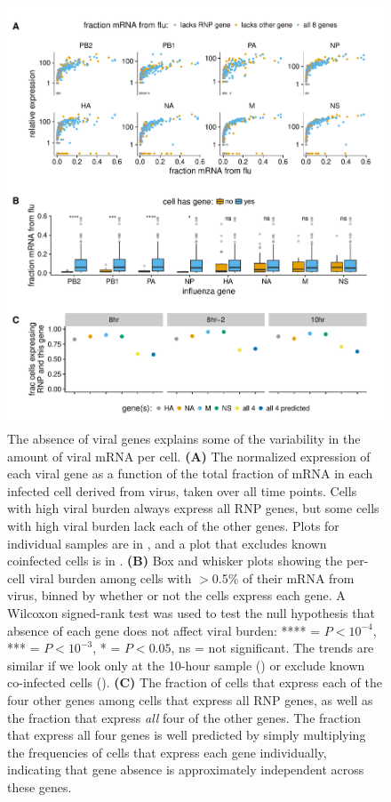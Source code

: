 \documentclass[9pt,lineno]{elife}
\begin{document}
\begin{figure}[t!]
\centerline{\includegraphics[width=0.9\linewidth]{figures/p_flu_burden_flu_gene_merge.pdf}}
\caption{\label{fig:fluburdenbyflugene}
The absence of viral genes explains some of the variability in the amount of viral mRNA per cell.
{\bf (A)} 
The normalized expression of each viral gene as a function of the total fraction of mRNA in each infected cell derived from virus, taken over all time points.
Cells with high viral burden always express all RNP genes, but some cells with high viral burden lack each of the other genes.
Plots for individual samples are in , and a plot that excludes known coinfected cells is in .
{\bf (B)}
Box and whisker plots showing the per-cell viral burden among cells with $>$0.5\% of their mRNA from virus, binned by whether or not the cells express each gene.
A Wilcoxon signed-rank test was used to test the null hypothesis that absence of each gene does not affect viral burden: **** = $P < 10^{-4}$, *** = $P < 10^{-3}$,  * = $P < 0.05$, ns = not significant.
The trends are similar if we look only at the 10-hour sample () or exclude known co-infected cells ().
{\bf (C)}
The fraction of cells that express each of the four other genes among cells that express all RNP genes, as well as the fraction that express \emph{all} four of the other genes.
The fraction that express all four genes is well predicted by simply multiplying the frequencies of cells that express each gene individually, indicating that gene absence is approximately independent across these genes.
}


\end{figure}
\end{document}
